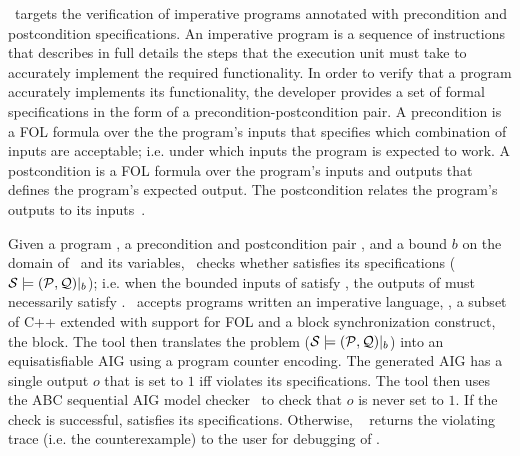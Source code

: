 \mytool~targets the verification of imperative programs annotated with 
precondition and postcondition specifications. An imperative program 
is a sequence of instructions that describes in full details the 
steps that the execution unit must take to accurately 
implement the required functionality. In order to verify 
that a program accurately implements its functionality, the developer
provides a set of formal specifications in the form of 
a precondition-postcondition pair. A precondition is a FOL formula over the 
the program's inputs that specifies which combination of inputs are acceptable; 
i.e. under which inputs the program is expected to work. 
A postcondition is a FOL formula over the program's inputs 
and outputs that defines the program's expected output. The
postcondition relates the program's outputs to its inputs~\cite{bradley2007calculus}. 

Given a program \Pm, 
a precondition and postcondition pair \pair{\Pre}{\Post}, 
and a bound $b$ on the domain of \Pm~and its variables,
\mytool~checks whether \Pm satisfies its specifications 
($\mathcal{S} \models (\mathcal{P}, \mathcal{Q})|_{b}$); i.e. when the bounded inputs 
of \Pm satisfy \Pre, the outputs of \Pm must necessarily satisfy \Post.
\mytool~accepts programs written an imperative language, \psqlanguage, 
a subset of C++ extended with support for FOL and a block synchronization 
construct, the  block.
The tool then translates the problem ($\mathcal{S} \models (\mathcal{P}, \mathcal{Q})|_{b}$)
into an equisatisfiable AIG using a program counter encoding. 
The generated AIG has a single output $o$ that is set to $1$ iff 
\Pm violates its specifications. The tool then uses the ABC
sequential AIG model checker~\cite{brayton2010abc} to check that $o$ is never set to $1$. 
If the check is successful, \Pm satisfies its specifications. Otherwise, \mytool~
returns the violating trace (i.e. the counterexample) to the user for debugging 
of \Pm.



